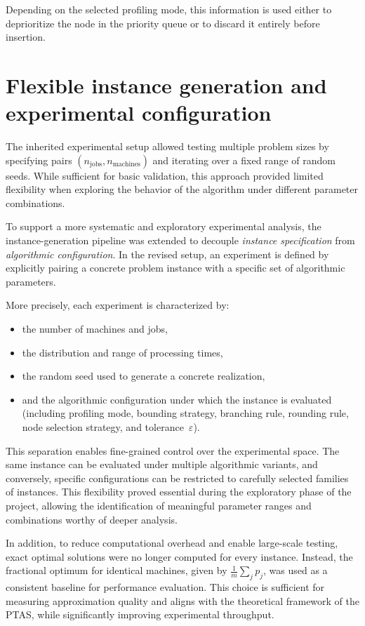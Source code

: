 Depending on the selected profiling mode, this information is used either to deprioritize the node in the priority queue or to discard it entirely before insertion.

\section{Flexible instance generation and experimental configuration}
\label{subsec:instance-generation}

The inherited experimental setup allowed testing multiple problem sizes by specifying pairs \((n_{\text{jobs}}, n_{\text{machines}})\) and iterating over a fixed range of random seeds.
While sufficient for basic validation, this approach provided limited flexibility when exploring the behavior of the algorithm under different parameter combinations.

To support a more systematic and exploratory experimental analysis, the instance-generation pipeline was extended to decouple \emph{instance specification} from \emph{algorithmic configuration}.
In the revised setup, an experiment is defined by explicitly pairing a concrete problem instance with a specific set of algorithmic parameters.

More precisely, each experiment is characterized by:
\begin{itemize}
  \item the number of machines and jobs,
  \item the distribution and range of processing times,
  \item the random seed used to generate a concrete realization,
  \item and the algorithmic configuration under which the instance is evaluated (including profiling mode, bounding strategy, branching rule, rounding rule, node selection strategy, and tolerance~\(\varepsilon\)).
\end{itemize}

This separation enables fine-grained control over the experimental space.
The same instance can be evaluated under multiple algorithmic variants, and conversely, specific configurations can be restricted to carefully selected families of instances.
This flexibility proved essential during the exploratory phase of the project, allowing the identification of meaningful parameter ranges and combinations worthy of deeper analysis.

In addition, to reduce computational overhead and enable large-scale testing, exact optimal solutions were no longer computed for every instance.
Instead, the fractional optimum for identical machines, given by $\frac{1}{m}\sum_j p_j$, was used as a consistent baseline for performance evaluation.
This choice is sufficient for measuring approximation quality and aligns with the theoretical framework of the PTAS, while significantly improving experimental throughput.

